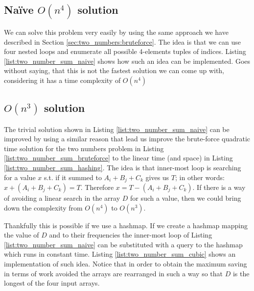 \subsection{Na\"ive $O(n^4)$ solution}
We can solve this problem very easily by using the same approach we have described in Section \ref{sec:two_numbers:bruteforce}.
The idea is that we can use four nested loops and enumerate all possible 4-elements tuples of indices. Listing \ref{list:two_number_sum_naive} shows how such an idea can be implemented.
Goes without saying, that this is not the fastest solution we can come up with, considering it has a time complexity of $O(n^4)$




\subsection{$O(n^3)$ solution}
The trivial solution shown in Listing \ref{list:two_number_sum_naive} can be improved by using a similar reason that lead us improve the brute-force 
quadratic time solution for the two numbers problem in Listing \ref{list:two_number_sum_bruteforce} to the linear time (and space) in Listing \ref{list:two_number_sum_hashing}.
The idea is that inner-most loop is searching for a value $x$  s.t. if it summed to $A_i+B_j+C_k$ gives us $T$; in other words: $x+(A_i+B_j+C_k)=T$.
Therefore $x = T-(A_i+B_j+C_k)$. If there is a way of avoiding a linear search in the array $D$ for such a value, then we could bring down the complexity from $O(n^4)$ to $O(n^3)$.

Thankfully this is possible if we use a hashmap. If we create a hashmap mapping the value of $D$ and to their frequencies the inner-most loop of Listing \ref{list:two_number_sum_naive} can be substituted with a query to the hashmap which 
runs in constant time. Listing \ref{list:two_number_sum_cubic} shows an implementation of such idea. 
Notice that in order to obtain the maximum saving in terms of work avoided the arrays are rearranged in such a way so that $D$ 
is the longest of the four input arrays. 




